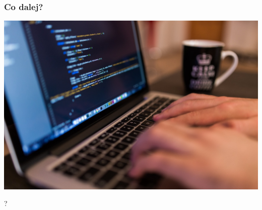 \documentclass[24pt]{beamer}
\begin{document}
\begin{frame}
    \frametitle{Co dalej?}
    \includegraphics[width=\textwidth]{images/coding.jpg}
\end{frame}

\begin{frame}
    \begin{center}
        \Huge ?
    \end{center}
\end{frame}

\endpage
\end{document}
